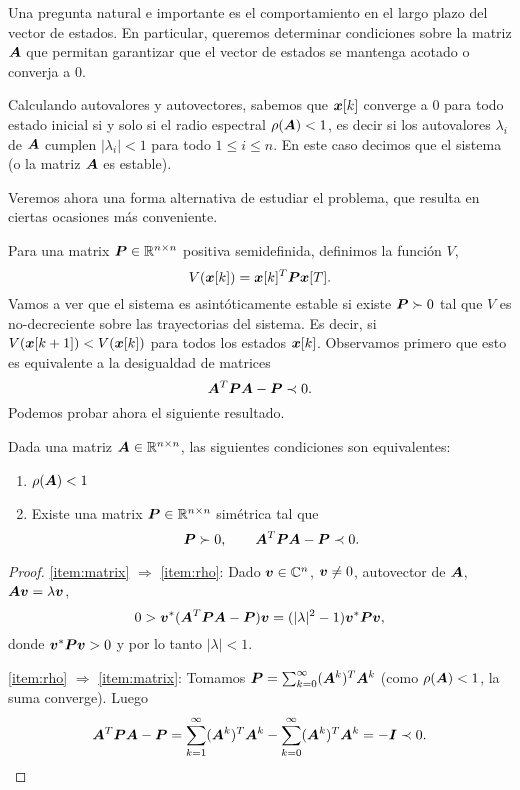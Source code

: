 Una pregunta natural e importante es el comportamiento en el largo plazo del vector de estados. En particular, queremos determinar condiciones sobre la matriz $\bm{A}$ que permitan garantizar que el vector de estados se mantenga acotado o converja a 0.

Calculando autovalores y autovectores, sabemos que $\bm{x}[k]$ converge a 0 para todo estado inicial si y solo si el radio espectral $\rho(\bm{A}) < 1$, es decir si los autovalores $\lambda_i$ de $\bm{A}$ cumplen $|\lambda_i| < 1$ para todo $1 \le i \le n$. En este caso decimos que el sistema (o la matriz $\bm{A}$ es estable).

Veremos ahora una forma alternativa de estudiar el problema, que resulta en ciertas ocasiones más conveniente.

Para una matrix $\bm{P} \in \mathbb{R}^{n \times n}$ positiva semidefinida, definimos la función $V$,
$$
V(\bm{x}[k]) = \bm{x}[k]^T \bm{P} \bm{x}[T].
$$
Vamos a ver que el sistema es asintóticamente estable si existe $\bm{P} \succ 0$ tal que $V$ es no-decreciente sobre las trayectorias del sistema. Es decir, si $V(\bm{x}[k+1]) < V(\bm{x}[k])$ para todos los estados $\bm{x}[k]$. Observamos primero que esto es equivalente a la desigualdad de matrices
$$
\bm{A}^T \bm{P} \bm{A} - \bm{P} \prec 0.
$$
Podemos probar ahora el siguiente resultado.

\begin{theorem}
Dada una matriz $\bm{A} \in \mathbb{R}^{n \times n}$, las siguientes condiciones son equivalentes:
\begin{enumerate}
\item \label{item:rho} $\rho(\bm{A}) < 1$
\item \label{item:matrix} Existe una matrix $\bm{P} \in \mathbb{R}^{n \times n}$ simétrica tal que
$$
\bm{P} \succ 0, \quad \quad \bm{A}^T \bm{P} \bm{A} - \bm{P}  \prec 0.
$$
\end{enumerate}
\end{theorem}

\begin{proof}
\ref{item:matrix} $\Rightarrow$ \ref{item:rho}: Dado $\bm{v} \in \mathbb{C}^n$, $\bm{v} \neq 0$, autovector de $\bm{A}$, $\bm{A}\bm{v} = \lambda \bm{v}$,
$$
0 > \bm{v}^* (\bm{A}^T \bm{P} \bm{A} - \bm{P})\bm{v} = (|\lambda|^2 - 1) \bm{v}^* \bm{P} \bm{v},
$$
donde $\bm{v}^* \bm{P} \bm{v} > 0$ y por lo tanto $|\lambda| < 1$.

\ref{item:rho} $\Rightarrow$ \ref{item:matrix}: Tomamos $\bm{P} = \sum_{k=0}^{\infty}(\bm{A}^k)^T \bm{A}^k$ (como $\rho(\bm{A}) < 1$, la suma converge). Luego
$$
\bm{A}^T \bm{P} \bm{A} - \bm{P} = \sum_{k=1}^{\infty} (\bm{A}^k)^T \bm{A}^k - \sum_{k=0}^{\infty} (\bm{A}^k)^T \bm{A}^k = - \bm{I} \prec 0.
$$
\end{proof}

